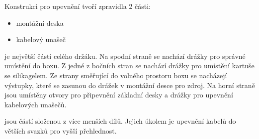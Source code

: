 Konstrukci pro upevnění tvoří zpravidla 2 části:
\begin{itemize}
    \item montážní deska
    \item kabelový unašeč
\end{itemize}

\noindent{} je největší částí celého držáku. 
Na spodní straně se nachází drážky pro správné umístění do boxu.
Z jedné z bočních stran se nachází drážky pro umístění kartuše se silikagelem.
Ze strany směřující do volného prostoru boxu se nacházejí výstupky, které se zasunou do drážek v montážní desce pro zdroj.
Na horní straně jsou umístěny otvory pro připevnění základní desky a drážky pro upevnění kabelových unašečů.

\noindent{} jsou částí složenou z více menších dílů.
Jejich úkolem je upevnění kabelů do větších svazků pro vyšší přehlednost.


\newpage
